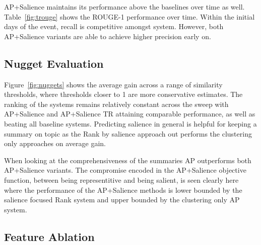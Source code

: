 AP+Salience maintains its performance above the baselines over time as well. Table~\ref{fig:trouge}
shows the ROUGE-1 performance over time. Within the initial days of the event, recall is 
competitive amongst system. However, both AP+Salience variants are able to achieve higher
precision early on.  

\subsection{Nugget Evaluation}

Figure~\ref{fig:nuggets} shows the average gain across a range of 
similarity thresholds, where thresholds closer to 1 are more conservative
estimates. The ranking of the systems remains relatively constant across the 
sweep with 
AP+Salience and AP+Salience TR attaining comparable performance, as well
as beating all baseline systems.
Predicting salience in general is helpful for keeping a summary on topic as
the Rank by salience approach out performs the clustering only approaches
on average gain.

When looking at the comprehensiveness of the summaries AP outperforms
both AP+Salience variants. The compromise encoded in the AP+Salience objective
function, between being representitive and being salient, is seen clearly here
where the performance of the AP+Salience methods is lower bounded by 
the salience focused Rank
system and upper bounded by the clustering only AP system.



\subsection{Feature Ablation}

